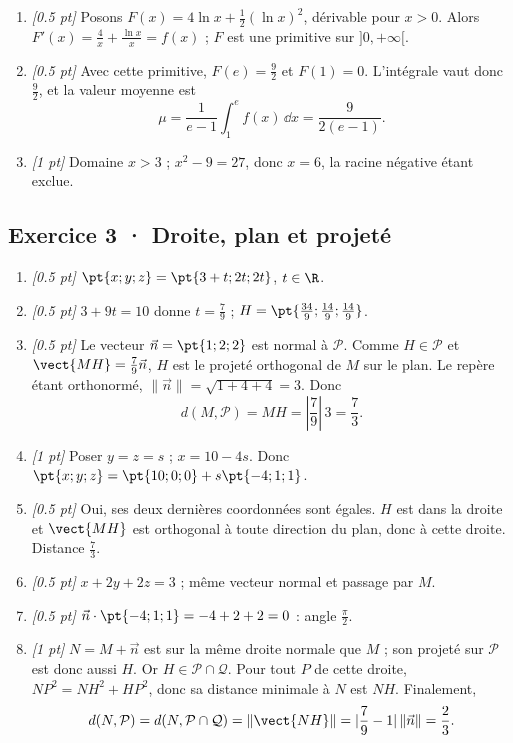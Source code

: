 \begin{enumerate}
\item \textit{[\num{0,5} pt]} Posons $F(x)=4\ln x+\frac12(\ln x)^2$, dérivable pour $x>0$. Alors $F'(x)=\frac{4}{x}+\frac{\ln x}{x}=f(x)$ ; $F$ est une primitive sur $]0,+\infty[$.

\item \textit{[\num{0,5} pt]} Avec cette primitive, $F(e)=\frac{9}{2}$ et $F(1)=0$. L'intégrale vaut donc $\frac{9}{2}$, et la valeur moyenne est
\[\mu=\frac{1}{e-1}\int_1^e f(x)\,\dd x=\frac{9}{2(e-1)}.\]

\item \textit{[1 pt]} Domaine $x>3$ ; $x^2-9=27$, donc $x=6$, la racine négative étant exclue.

\end{enumerate}

\subsection*{Exercice 3 · Droite, plan et projeté}\begin{enumerate}

\item \textit{[\num{0,5} pt]} $\pt{x;y;z}=\pt{3+t;2t;2t}$, $t\in\R$.

\item \textit{[\num{0,5} pt]} $3+9t=10$ donne $t=\frac{7}{9}$ ; $H=\pt{\frac{34}{9};\frac{14}{9};\frac{14}{9}}$.

\item \textit{[\num{0,5} pt]} Le vecteur $\vec n=\pt{1;2;2}$ est normal à $\mathcal P$. Comme $H\in\mathcal P$ et $\vect{MH}=\frac{7}{9}\vec n$, $H$ est le projeté orthogonal de $M$ sur le plan. Le repère étant orthonormé, $\|\vec n\|=\sqrt{1+4+4}=3$. Donc
\[d(M,\mathcal P)=MH=|\frac{7}{9}|\,3=\frac{7}{3}.\]

\item \textit{[1 pt]} Poser $y=z=s$ ; $x=10-4s$. Donc $\pt{x;y;z}=\pt{10;0;0}+s\pt{-4;1;1}$.

\item \textit{[\num{0,5} pt]} Oui, ses deux dernières coordonnées sont égales. $H$ est dans la droite et $\vect{MH}$ est orthogonal à toute direction du plan, donc à cette droite. Distance $\frac{7}{3}$.

\item \textit{[\num{0,5} pt]} $x+2y+2z=3$ ; même vecteur normal et passage par $M$.

\item \textit{[\num{0,5} pt]} $\vec n\cdot\pt{-4;1;1}=-4+2+2=0$ : angle $\frac{\pi}{2}$.

\item \textit{[1 pt]} $N=M+\vec n$ est sur la même droite normale que $M$ ; son projeté sur $\mathcal P$ est donc aussi $H$. Or $H\in\mathcal P\cap\mathcal Q$. Pour tout $P$ de cette droite, $NP^2=NH^2+HP^2$, donc sa distance minimale à $N$ est $NH$. Finalement,
\[d(N,\mathcal P)=d(N,\mathcal P\cap\mathcal Q)=\|\vect{NH}\|=|\frac{7}{9}-1|\,\|\vec n\|=\frac{2}{3}.\]

\end{enumerate}

